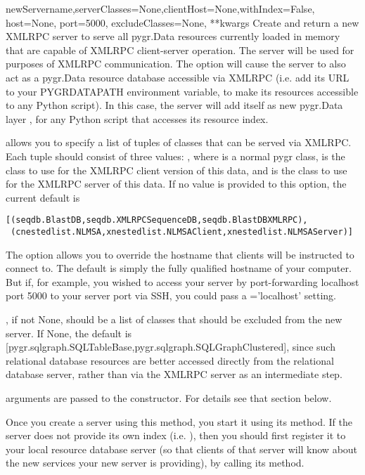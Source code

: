 \documentclass{howto}
\begin{document}
\begin{funcdesc}{newServer}{name,serverClasses=None,clientHost=None,withIndex=False, host=None, port=5000, excludeClasses=None, **kwargs}
  Create and return a new XMLRPC server to serve all pygr.Data resources 
  currently loaded in memory that are capable of XMLRPC client-server
  operation.  The server  will be used for 
  purposes of XMLRPC communication.  The  option
  will cause the server to also act as a pygr.Data resource database
  accessible via XMLRPC (i.e. add its URL to your PYGRDATAPATH environment
  variable, to make its resources accessible to any Python script).
  In this case, the server will add itself as new pygr.Data layer
  , for any Python script that accesses its resource index.

   allows you to specify a list of tuples of
  classes that can be served via XMLRPC.  Each tuple should consist of
  three values: , where 
   is a normal pygr class,  is the 
  class to use for the XMLRPC client version of this data, and
   is the class to use for the XMLRPC server of
  this data.  If no value is provided to this option, the current
  default is 
\begin{verbatim}
[(seqdb.BlastDB,seqdb.XMLRPCSequenceDB,seqdb.BlastDBXMLRPC),
 (cnestedlist.NLMSA,xnestedlist.NLMSAClient,xnestedlist.NLMSAServer)] 
\end{verbatim}
  The  option allows you to override the hostname
  that clients will be instructed to connect to.  The default is simply
  the fully qualified hostname of your computer.  But if, for example,
  you wished to access your server by port-forwarding localhost port 5000
  to your server port via SSH, you could pass a ='localhost'
  setting.

  , if not None, should be a list of classes that
  should be excluded from the new server.  If None, the default is
  [pygr.sqlgraph.SQLTableBase,pygr.sqlgraph.SQLGraphClustered], since
  such relational database resources are better accessed directly from
  the relational database server, rather than via the XMLRPC server as
  an intermediate step.

   arguments are passed to the  constructor.
  For details see that section below.

  Once you create a server using this method, you start it using its
   method.  If the server does not provide its
  own index (i.e. ), then you should first register
  it to your local resource database server (so that clients of that server
  will know about the new services your new server is providing), by
  calling its  method.
\end{funcdesc}
\end{document}
